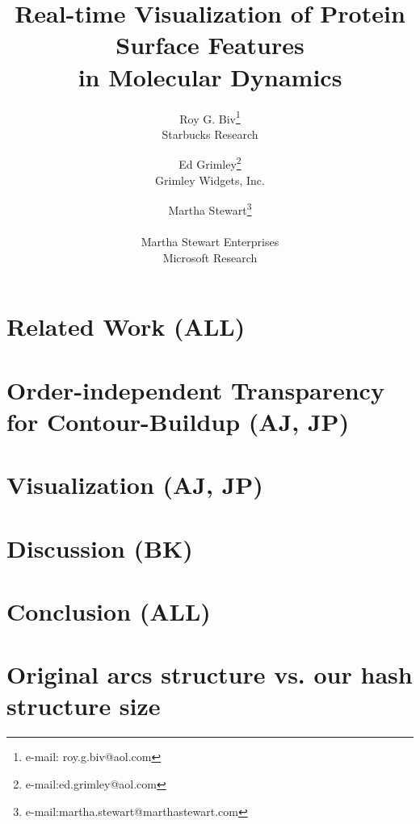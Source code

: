 \documentclass[review]{vgtc}                 %
\title{Real-time Visualization of Protein Surface Features\\in Molecular Dynamics}
\author{Roy G. Biv\thanks{e-mail: roy.g.biv@aol.com}\\ %
        \scriptsize Starbucks Research %
\and Ed Grimley\thanks{e-mail:ed.grimley@aol.com}\\ %
     \scriptsize Grimley Widgets, Inc. %
\and Martha Stewart\thanks{e-mail:martha.stewart@marthastewart.com}\\ %
     \parbox{1.4in}{\scriptsize \centering Martha Stewart Enterprises \\ Microsoft Research}}
\begin{document}


\maketitle



\section{Related Work (ALL)}


\section{Order-independent Transparency for Contour-Buildup (AJ, JP)}


\section{Visualization (AJ, JP)}


\section{Discussion (BK)}


\section{Conclusion (ALL)}






\appendix
\section{Original arcs structure vs. our hash structure size}

\end{document}
